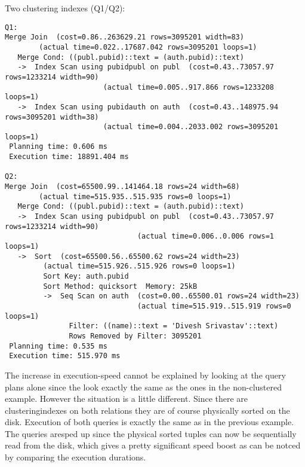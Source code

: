 \documentclass[11pt]{scrartcl}
\begin{document}
\noindent Two clustering indexes  (Q1/Q2):
{\small
\begin{verbatim}
Q1:
Merge Join  (cost=0.86..263629.21 rows=3095201 width=83)
	    (actual time=0.022..17687.042 rows=3095201 loops=1)
   Merge Cond: ((publ.pubid)::text = (auth.pubid)::text)
   ->  Index Scan using pubidpubl on publ  (cost=0.43..73057.97 rows=1233214 width=90)
					   (actual time=0.005..917.866 rows=1233208 loops=1)
   ->  Index Scan using pubidauth on auth  (cost=0.43..148975.94 rows=3095201 width=38)
					   (actual time=0.004..2033.002 rows=3095201 loops=1)
 Planning time: 0.606 ms
 Execution time: 18891.404 ms

Q2:
Merge Join  (cost=65500.99..141464.18 rows=24 width=68)
	    (actual time=515.935..515.935 rows=0 loops=1)
   Merge Cond: ((publ.pubid)::text = (auth.pubid)::text)
   ->  Index Scan using pubidpubl on publ  (cost=0.43..73057.97 rows=1233214 width=90)
    				           (actual time=0.006..0.006 rows=1 loops=1)
   ->  Sort  (cost=65500.56..65500.62 rows=24 width=23)
	     (actual time=515.926..515.926 rows=0 loops=1)
         Sort Key: auth.pubid
         Sort Method: quicksort  Memory: 25kB
         ->  Seq Scan on auth  (cost=0.00..65500.01 rows=24 width=23)
                               (actual time=515.919..515.919 rows=0 loops=1)
               Filter: ((name)::text = 'Divesh Srivastav'::text)
               Rows Removed by Filter: 3095201
 Planning time: 0.535 ms
 Execution time: 515.970 ms
\end{verbatim}
The increase in execution-speed cannot be explained by looking at the query plans alone since the look exactly the same as the ones in the non-clustered example. However the situation is a little different.
Since there are clusteringindexes on both relations they are of course physically sorted on the disk. Execution of both queries is exactly the same as in the previous example.
The queries aresped up since the physical sorted tuples can now be sequentially read from the disk, which gives a pretty significant speed boost as can be notced by comparing the execution durations.
}
\end{document}
